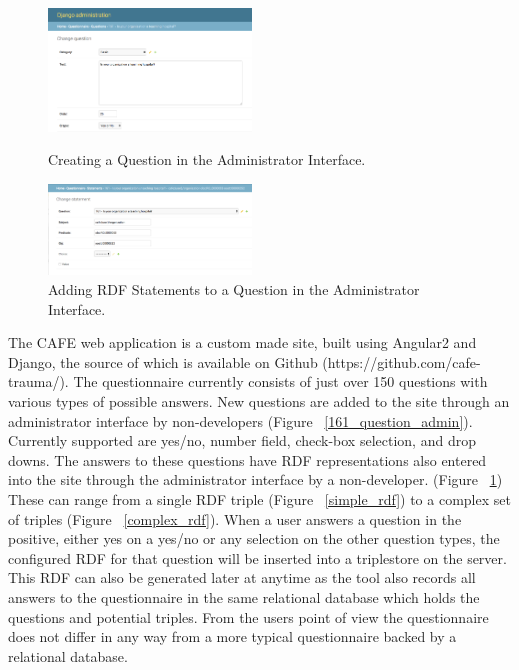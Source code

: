 \documentclass{amia}
\begin{document}
\begin{figure}
  \begin{center}
    \includegraphics[width=0.48\textwidth]{pics/161_question_admin.png}
  \end{center}
  \caption{Creating a Question in the Administrator Interface.}
  \label{161_question_admin}
  \vspace{5mm}  
   \begin{center}
    \includegraphics[width=0.48\textwidth]{pics/161_statement_admin.png}
  \end{center}
  \caption{Adding RDF Statements to a Question in the Administrator Interface.}
  \label{161_statement_admin}
\end{figure}

The CAFE web application is a custom made site, built using Angular2 and Django, the source of which is available on Github (https://github.com/cafe-trauma/).
The questionnaire currently consists of just over 150 questions with various types of possible answers.
New questions are added to the site through an administrator interface by non-developers (Figure ~\ref{161_question_admin}).
Currently supported are yes/no, number field, check-box selection, and drop downs.
The answers to these questions have RDF representations also entered into the site through the administrator interface by a non-developer. (Figure ~\ref{161_statement_admin})
These can range from a single RDF triple (Figure ~\ref{simple_rdf}) to a complex set of triples (Figure ~\ref{complex_rdf}).
When a user answers a question in the positive, either yes on a yes/no or any selection on the other question types, the configured RDF for that question will be inserted into a triplestore on the server.
This RDF can also be generated later at anytime as the tool also records all answers to the questionnaire in the same relational database which holds the questions and potential triples.
From the users point of view the questionnaire does not differ in any way from a more typical questionnaire backed by a relational database.
\end{document}
